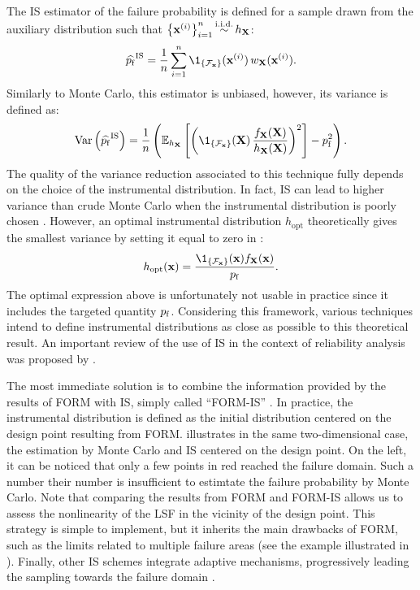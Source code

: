 The IS estimator of the failure probability is defined for a sample drawn from the auxiliary distribution such that $\left\{{\bf x}^{(i)}\right\}_{i=1}^n \mathop{\sim}\limits^{\mathrm{i.i.d.}} h_{\bf X}$: 
\begin{equation}
    \what{\pf}^{\mathrm{IS}} = \frac1n \sum_{i=1}^{n} \1_{\{\iF_\bx\}}(\bx^{(i)}) \, w_\bX(\bx^{(i)}).
    \label{eq:pf_IS}
\end{equation}
Similarly to Monte Carlo, this estimator is unbiased, however, its variance is defined as: 
\begin{equation}
    \var\left( \what{\pf}^{\mathrm{IS}}\right) = \frac1n \left( \E_{h_\bX}\left[\left(\1_{\{\iF_\bx\}}(\bX) \, \frac{f_\bX(\bX)}{h_\bX(\bX)}\right)^2\right] - \pf^2\right).
    \label{eq:IS_variance}
\end{equation}
The quality of the variance reduction associated to this technique fully depends on the choice of the instrumental distribution. 
In fact, IS can lead to higher variance than crude Monte Carlo when the instrumental distribution is poorly chosen \citep{owen_zhou_2000_is}. 
However, an optimal instrumental distribution $h_{\mathrm{opt}}$ theoretically gives the smallest variance by setting it equal to zero in : 
\begin{equation}
    h_{\mathrm{opt}}(\bx) = \frac{\1_{\{\iF_\bx\}}(\bx) f_\bX(\bx)}{\pf}. 
\end{equation}
The optimal expression above is unfortunately not usable in practice since it includes the targeted quantity $p_\mathrm{f}$. 
Considering this framework, various techniques intend to define instrumental distributions as close as possible to this theoretical result. 
An important review of the use of IS in the context of reliability analysis was proposed by \citet{tabandeh_2022_IS_review}. 

The most immediate solution is to combine the information provided by the results of FORM with IS, simply called ``FORM-IS'' \citep{melchers_1989_formis}. 
In practice, the instrumental distribution is defined as the initial distribution centered on the design point resulting from FORM. 
 illustrates in the same two-dimensional case, the estimation by Monte Carlo and IS centered on the design point. 
On the left, it can be noticed that only a few points in red reached the failure domain. 
Such a number their number is insufficient to estimtate the failure probability by Monte Carlo.  
Note that comparing the results from FORM and FORM-IS allows us to assess the nonlinearity of the LSF in the vicinity of the design point.  
This strategy is simple to implement, but it inherits the main drawbacks of FORM, such as the limits related to multiple failure areas (see the example illustrated in ). 
Finally, other IS schemes integrate adaptive mechanisms, progressively leading the sampling towards the failure domain \citep{bugallo_2017_AIS_review}.  



